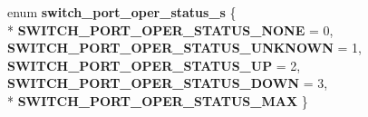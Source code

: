 \begin{DoxyCompactItemize}
\item 
\hypertarget{group__Port_gadaa4a2ef52dc0bdd217b76cec3f8e275}{enum {\bfseries switch\+\_\+port\+\_\+oper\+\_\+status\+\_\+s} \{ \\*
{\bfseries S\+W\+I\+T\+C\+H\+\_\+\+P\+O\+R\+T\+\_\+\+O\+P\+E\+R\+\_\+\+S\+T\+A\+T\+U\+S\+\_\+\+N\+O\+N\+E} = 0, 
{\bfseries S\+W\+I\+T\+C\+H\+\_\+\+P\+O\+R\+T\+\_\+\+O\+P\+E\+R\+\_\+\+S\+T\+A\+T\+U\+S\+\_\+\+U\+N\+K\+N\+O\+W\+N} = 1, 
{\bfseries S\+W\+I\+T\+C\+H\+\_\+\+P\+O\+R\+T\+\_\+\+O\+P\+E\+R\+\_\+\+S\+T\+A\+T\+U\+S\+\_\+\+U\+P} = 2, 
{\bfseries S\+W\+I\+T\+C\+H\+\_\+\+P\+O\+R\+T\+\_\+\+O\+P\+E\+R\+\_\+\+S\+T\+A\+T\+U\+S\+\_\+\+D\+O\+W\+N} = 3, 
\\*
{\bfseries S\+W\+I\+T\+C\+H\+\_\+\+P\+O\+R\+T\+\_\+\+O\+P\+E\+R\+\_\+\+S\+T\+A\+T\+U\+S\+\_\+\+M\+A\+X}
 \}}\label{group__Port_gadaa4a2ef52dc0bdd217b76cec3f8e275}


\end{DoxyCompactItemize}
